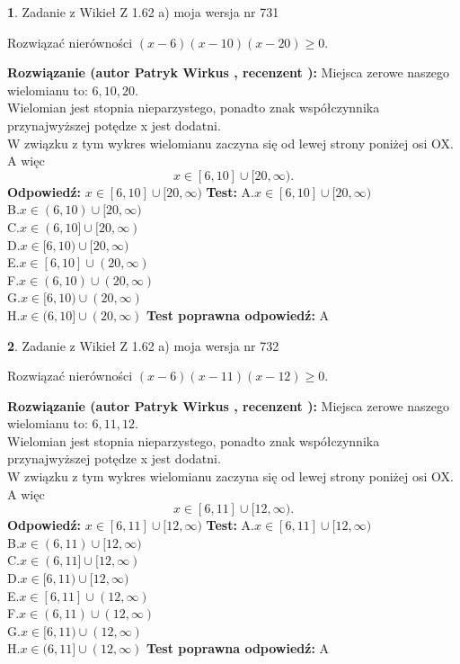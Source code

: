 \documentclass[12pt, a4paper]{article}
\theoremstyle{definition} %
\newtheorem{zad}{}
\newcommand{\zadStart}[1]{\begin{zad}#1\newline}
\newcommand{\zadStop}{\end{zad}}
\newcommand{\rozwStart}[2]{\noindent \textbf{Rozwiązanie (autor #1 , recenzent #2): }\newline}
\newcommand{\rozwStop}{\newline}
\newcommand{\odpStart}{\noindent \textbf{Odpowiedź:}\newline}
\newcommand{\odpStop}{\newline}
\newcommand{\testStart}{\noindent \textbf{Test:}\newline}
\newcommand{\testStop}{\newline}
\newcommand{\kluczStart}{\noindent \textbf{Test poprawna odpowiedź:}\newline}
\newcommand{\kluczStop}{\newline}
\begin{document}
\zadStart{Zadanie z Wikieł Z 1.62 a) moja wersja nr 731}

Rozwiązać nierówności $(x-6)(x-10)(x-20)\ge0$.
\zadStop
\rozwStart{Patryk Wirkus}{}
Miejsca zerowe naszego wielomianu to: $6, 10, 20$.\\
Wielomian jest stopnia nieparzystego, ponadto znak współczynnika przy\linebreak najwyższej potędze x jest dodatni.\\ W związku z tym wykres wielomianu zaczyna się od lewej strony poniżej osi OX. A więc $$x \in [6,10] \cup [20,\infty).$$
\rozwStop
\odpStart
$x \in [6,10] \cup [20,\infty)$
\odpStop
\testStart
A.$x \in [6,10] \cup [20,\infty)$\\
B.$x \in (6,10) \cup [20,\infty)$\\
C.$x \in (6,10] \cup [20,\infty)$\\
D.$x \in [6,10) \cup [20,\infty)$\\
E.$x \in [6,10] \cup (20,\infty)$\\
F.$x \in (6,10) \cup (20,\infty)$\\
G.$x \in [6,10) \cup (20,\infty)$\\
H.$x \in (6,10] \cup (20,\infty)$
\testStop
\kluczStart
A
\kluczStop



\zadStart{Zadanie z Wikieł Z 1.62 a) moja wersja nr 732}

Rozwiązać nierówności $(x-6)(x-11)(x-12)\ge0$.
\zadStop
\rozwStart{Patryk Wirkus}{}
Miejsca zerowe naszego wielomianu to: $6, 11, 12$.\\
Wielomian jest stopnia nieparzystego, ponadto znak współczynnika przy\linebreak najwyższej potędze x jest dodatni.\\ W związku z tym wykres wielomianu zaczyna się od lewej strony poniżej osi OX. A więc $$x \in [6,11] \cup [12,\infty).$$
\rozwStop
\odpStart
$x \in [6,11] \cup [12,\infty)$
\odpStop
\testStart
A.$x \in [6,11] \cup [12,\infty)$\\
B.$x \in (6,11) \cup [12,\infty)$\\
C.$x \in (6,11] \cup [12,\infty)$\\
D.$x \in [6,11) \cup [12,\infty)$\\
E.$x \in [6,11] \cup (12,\infty)$\\
F.$x \in (6,11) \cup (12,\infty)$\\
G.$x \in [6,11) \cup (12,\infty)$\\
H.$x \in (6,11] \cup (12,\infty)$
\testStop
\kluczStart
A
\kluczStop
\end{document}
